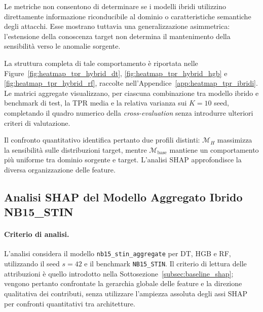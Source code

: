 Le metriche non consentono di determinare se i modelli ibridi utilizzino direttamente informazione riconducibile al dominio o caratteristiche semantiche degli attacchi. 
Esse mostrano tuttavia una generalizzazione asimmetrica: l'estensione della conoscenza target non determina il mantenimento della sensibilità verso le anomalie sorgente.

La struttura completa di tale comportamento è riportata nelle Figure~\ref{fig:heatmap_tpr_hybrid_dt}, \ref{fig:heatmap_tpr_hybrid_hgb} e \ref{fig:heatmap_tpr_hybrid_rf}, raccolte nell'Appendice~\ref{app:heatmap_tpr_ibridi}.
Le matrici aggregate visualizzano, per ciascuna combinazione tra modello ibrido e benchmark di test, la TPR media e la relativa varianza sui $K=10$ seed, completando il quadro numerico della \textit{cross-evaluation} senza introdurre ulteriori criteri di valutazione.

Il confronto quantitativo identifica pertanto due profili distinti: $\mathcal{M}_{H}$ massimizza la sensibilità sulle distribuzioni target, mentre $\mathcal{M}_{\mathrm{base}}$ mantiene un comportamento più uniforme tra dominio sorgente e target. 
L'analisi SHAP approfondisce la diversa organizzazione delle feature.



\subsection{Analisi SHAP del Modello Aggregato Ibrido NB15\_STIN}
\label{subsec:ibridi_shap}

\paragraph{Criterio di analisi.}
L'analisi considera il modello \texttt{nb15\_stin\_aggregate} per DT, HGB e RF, utilizzando il seed $s=42$ e il benchmark \texttt{NB15\_STIN}. 
Il criterio di lettura delle attribuzioni è quello introdotto nella Sottosezione~\ref{subsec:baseline_shap}; vengono pertanto confrontate la gerarchia globale delle feature e la direzione qualitativa dei contributi, senza utilizzare l'ampiezza assoluta degli assi SHAP per confronti quantitativi tra architetture.

